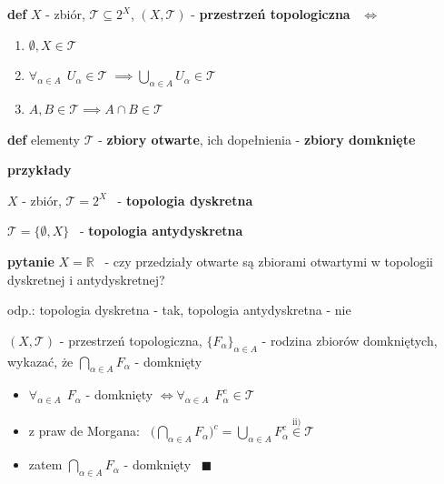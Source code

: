 \documentclass[a4paper,12pt]{article}
\begin{document}
\bigskip
\bigskip
{}

\bigskip
\textbf{def} \; \(X\) - zbiór, \; \(\mathcal{T} \subseteq 2^X\), \; \((X, \mathcal{T})\) - \textbf{przestrzeń topologiczna} \, \(\iff\)
\begin{enumerate}[label=\roman*), leftmargin=1.9em, itemsep=0.2em, topsep=0.2em, parsep=0pt, partopsep=0pt]
    \item \(\emptyset, X \in \mathcal{T}\)
    \item \(\forall_{\alpha \in A} \;\, U_\alpha \in \mathcal{T} \; \implies \displaystyle\bigcup_{\alpha \in A} U_\alpha \in \mathcal{T}\)
    \item \(A, B \in \mathcal{T} \implies A \cap B \in \mathcal{T}\)
\end{enumerate}

\smallskip
\textbf{def} \; elementy \(\mathcal{T}\) - \textbf{zbiory otwarte}, \; ich dopełnienia - \textbf{zbiory domknięte}

\bigskip
\begin{logbox}
\textbf{przykłady}
\begin{steps}
    \item \(X\) - zbiór, \; \(\mathcal{T} = 2^X\) \, - \textbf{topologia dyskretna}
    \item \(\mathcal{T} = \{\emptyset, X\}\) \, - \textbf{topologia antydyskretna}
\end{steps}
\end{logbox}

\bigskip
\textbf{pytanie} \; \(X = \mathbb{R}\) \, - czy przedziały otwarte są zbiorami otwartymi w topologii dyskretnej i antydyskretnej?

\smallskip
odp.: topologia dyskretna - tak, \; topologia antydyskretna - nie

\bigskip
\zdc \; \((X, \mathcal{T})\) - przestrzeń topologiczna, \; \(\{F_\alpha\}_{\alpha \in A}\) - rodzina zbiorów domkniętych, \; wykazać, że \(\bigcap_{\alpha \in A} F_\alpha\) - domknięty
\begin{itemize}
    \item \(\forall_{\alpha \in A} \;\, F_\alpha\) - domknięty \(\iff \forall_{\alpha \in A} \;\, F_\alpha^c \in \mathcal{T}\)
    \item z praw de Morgana: \, \(\Big(\bigcap_{\alpha \in A} F_\alpha\Big)^c = \bigcup_{\alpha \in A} F_\alpha^c \overset{\text{ii)}}{\in} \mathcal{T}\)
    \item zatem \(\bigcap_{\alpha \in A} F_\alpha\) - domknięty \, \(\blacksquare\)
\end{itemize}
\end{document}
